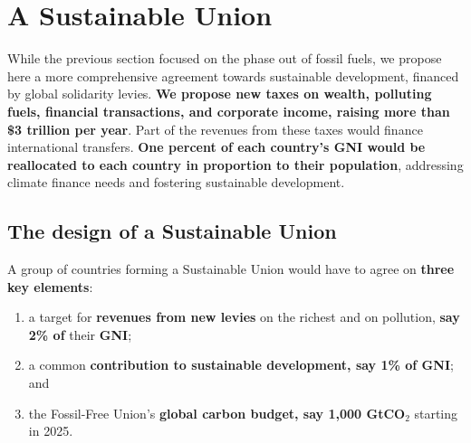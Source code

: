 \documentclass[12pt,english]{article}
\begin{document}


\clearpage

\section{A Sustainable Union\label{sec:su}}

While the previous section focused on the phase out of fossil fuels, we propose here a more comprehensive agreement towards sustainable development, financed by global solidarity levies.\textbf{ We propose new taxes on wealth, polluting fuels, financial transactions, and corporate income, raising more than \$3 trillion per year}. Part of the revenues from these taxes would finance international transfers. \textbf{One percent of each country's GNI would be reallocated to each country in proportion to their population}, addressing climate finance needs and fostering sustainable development.

\subsection{The design of a Sustainable Union\label{subsec:principles_sa}}

A group of countries forming a Sustainable Union would have to agree on \textbf{three key elements}:
\begin{enumerate}
  \item a target for \textbf{revenues from new levies} on the richest and on pollution, \textbf{say 2\% of} their \textbf{GNI};
  \item a common \textbf{contribution to sustainable development, say 1\% of GNI}; and
  \item the Fossil-Free Union's \textbf{global carbon budget, say 1,000 GtCO$_\text{2}$} starting in 2025.
\end{enumerate}
\end{document}

